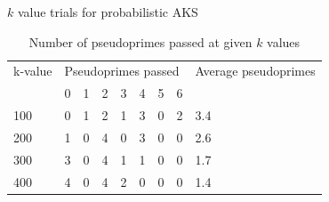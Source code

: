 \documentclass[pdf]{beamer}
\begin{document}
\begin{frame}{$k$ value trials for probabilistic AKS}
    \begin{table}
        \caption{Number of pseudoprimes passed at given $k$ values\label{table:paks_pprimes_v_bases}}
        \begin{tabular}{l|lllllll|l}
            \toprule
            k-value & \multicolumn{7}{l|}{Pseudoprimes passed} & Average pseudoprimes  \\
            & 0 & 1 & 2 & 3 & 4 & 5 & 6                &                       \\
            \hline
            100     & 0 & 1 & 2 & 1 & 3 & 0 & 2                & 3.4                   \\
            200     & 1 & 0 & 4 & 0 & 3 & 0 & 0                & 2.6                   \\
            300     & 3 & 0 & 4 & 1 & 1 & 0 & 0                & 1.7                   \\
            400     & 4 & 0 & 4 & 2 & 0 & 0 & 0                & 1.4                   \\
            \bottomrule
        \end{tabular}
    \end{table}
    \begin{outline}
    \end{outline}
\end{frame}
\end{document}
